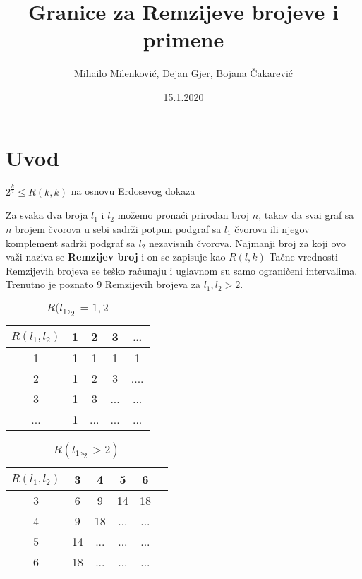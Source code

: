 \documentclass{article}
\title{Granice za Remzijeve brojeve i primene}
\date{15.1.2020}
\author{Mihailo Milenković, Dejan Gjer, Bojana Čakarević}
\theoremstyle{definition}
\begin{document}
		\maketitle

		\newpage

		\tableofcontents

		\newpage

		\section{Uvod}

		$ 2^{\frac{k}{2}} \leq R(k,k)$ na osnovu Erdosevog dokaza \cite{theBook}

		\lipsum[1]
		
		\newpage 
		Za svaka dva broja $l_1$ i $l_2$ možemo pronaći prirodan broj $n$, takav da svai graf sa $n$ brojem čvorova u sebi sadrži potpun podgraf sa $l_1$ čvorova ili njegov komplement sadrži podgraf sa $l_2$ nezavisnih čvorova.
	\newline
	Najmanji broj za koji ovo važi naziva se \textbf{Remzijev broj} i on se zapisuje kao $R(l,k)$ 
	\newline
	Tačne vrednosti Remzijevih brojeva se teško računaju i uglavnom su samo ograničeni intervalima. Trenutno je poznato 9 Remzijevih brojeva za $l_1,l_2>2$.
	\newline
	\begin{table}[h]
	    \centering
	    \begin{tabular}{|c|c|c|c|c|}
	    \hline
	    $R(l_1,l_2)$   &  1 & 2 & 3 & \ldots \\
	    \hline
	       1  & 1 & 1 & 1 &  1 \\
	       \hline
	       2 & 1 & 2 & 3 & ....\\
	       \hline
	       3 & 1 & 3 & ... & ... \\
	       \hline
	       ... & 1 & ... & ... & ... \\
	       \hline
	    \end{tabular}
	    \caption{$R(l_1,_2=1,2$}
	\end{table}
	
	\begin{table}[h]
	    \centering
	    \begin{tabular}{|c|c|c|c|c|c|}
	    \hline
	    $R(l_1,l_2)$    &  3 & 4 & 5 & 6 \\
	    \hline
	       3  & 6 & 9 & 14 &  18 \\
	       \hline
	       4 & 9 & 18 & ... & ...\\
	       \hline
	       5 & 14 & ... & ... & ... \\
	       \hline
	       6 & 18 & ... & ... & ... \\
	       \hline
	    \end{tabular}
	    \caption{$R(l_1,_2>2)$}
	    \end{table}
	
\end{document}
